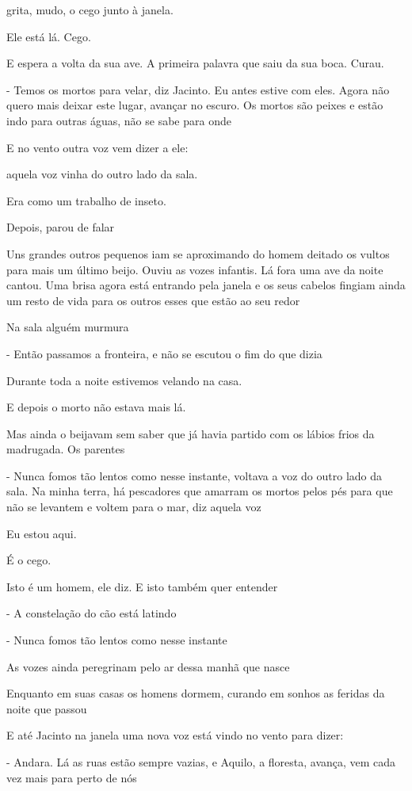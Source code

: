 grita, mudo, o cego junto à janela.

Ele está lá. Cego.

E espera a volta da sua ave. A primeira palavra que saiu da sua boca.
Curau.

- Temos os mortos para velar, diz Jacinto. Eu antes estive com eles.
Agora não quero mais deixar este lugar, avançar no escuro. Os mortos são
peixes e estão indo para outras águas, não se sabe para onde

E no vento outra voz vem dizer a ele:

aquela voz vinha do outro lado da sala.

Era como um trabalho de inseto.

Depois, parou de falar

Uns grandes outros pequenos iam se aproximando do homem deitado os
vultos para mais um último beijo. Ouviu as vozes infantis. Lá fora uma
ave da noite cantou. Uma brisa agora está entrando pela janela e os seus
cabelos fingiam ainda um resto de vida para os outros esses que estão ao
seu redor

Na sala alguém murmura

- Então passamos a fronteira, e não se escutou o fim do que dizia

Durante toda a noite estivemos velando na casa.

E depois o morto não estava mais lá.

Mas ainda o beijavam sem saber que já havia partido com os lábios frios
da madrugada. Os parentes

- Nunca fomos tão lentos como nesse instante, voltava a voz do outro
lado da sala. Na minha terra, há pescadores que amarram os mortos pelos
pés para que não se levantem e voltem para o mar, diz aquela voz

Eu estou aqui.

É o cego.

Isto é um homem, ele diz. E isto também quer entender

- A constelação do cão está latindo

- Nunca fomos tão lentos como nesse instante

As vozes ainda peregrinam pelo ar dessa manhã que nasce

Enquanto em suas casas os homens dormem, curando em sonhos as feridas da
noite que passou

E até Jacinto na janela uma nova voz está vindo no vento para dizer:

- Andara. Lá as ruas estão sempre vazias, e Aquilo, a floresta, avança,
vem cada vez mais para perto de nós

